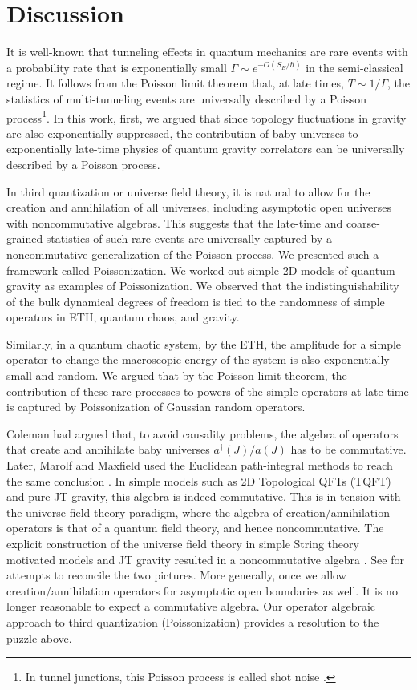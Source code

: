\documentclass[a4paper,11pt]{article}
\theoremstyle{definition}
\numberwithin{equation}{section}
\begin{document}
\section{Discussion}

It is well-known that tunneling effects in quantum mechanics are rare events with a probability rate that is exponentially small $\Gamma\sim e^{-O(S_E/\hbar)}$ in the semi-classical regime. It follows from the Poisson limit theorem that, at late times, $T\sim 1/\Gamma$, the statistics of multi-tunneling events are universally described by a Poisson process\footnote{In tunnel junctions, this Poisson process is called shot noise \cite{blanter2000shot}.}. In this work, first, we argued that since topology fluctuations in gravity are also exponentially suppressed, the contribution of baby universes to exponentially late-time physics of quantum gravity correlators can be universally described by a Poisson process. 

In third quantization or universe field theory, it is natural to allow for the creation and annihilation of all universes, including asymptotic open universes with noncommutative algebras. This suggests that the late-time and coarse-grained statistics of such rare events are universally captured by a noncommutative generalization of the Poisson process. We presented such a framework called Poissonization. We worked out simple 2D models of quantum gravity as examples of Poissonization. We observed that the indistinguishability of the bulk dynamical degrees of freedom is tied to the randomness of simple operators in ETH, quantum chaos, and gravity.

Similarly, in a quantum chaotic system, by the ETH, the amplitude for a simple operator to change the macroscopic energy of the system is also exponentially small and random. We argued that by the Poisson limit theorem, the contribution of these rare processes to powers of the simple operators at late time is captured by Poissonization of Gaussian random operators. 

Coleman had argued that, to avoid causality problems, the algebra of operators that create and annihilate baby universes $a^\dagger(J)/a(J)$ has to be commutative. Later, Marolf and Maxfield used the Euclidean path-integral methods to reach the same conclusion \cite{MM}. In simple models such as 2D Topological QFTs (TQFT) and pure JT gravity, this algebra is indeed commutative. This is in tension with the universe field theory paradigm, where the algebra of creation/annihilation operators is that of a quantum field theory, and hence noncommutative. The explicit construction of the universe field theory in simple  String theory motivated models and JT gravity resulted in a noncommutative algebra \cite{giddings1988axion,post2022universe}. See \cite{anous2020density,casali2022baby} for attempts to reconcile the two pictures. 
More generally, once we allow creation/annihilation operators for asymptotic open boundaries as well. It is no longer reasonable to expect a commutative algebra. Our operator algebraic approach to third quantization (Poissonization) provides a resolution to the puzzle above.
\end{document}
